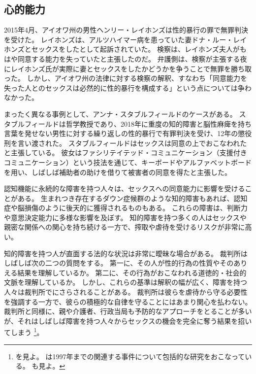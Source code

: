 \documentclass[paper=a4,book,openany]{jlreq}
\begin{document}
\subsection{心的能力}

2015年4月、アイオワ州の男性ヘンリー・レイホンズは性的暴行の罪で無罪判決を受けた。
レイホンズは、アルツハイマー病を患っていた妻ドナ・ルー・レイホンズとセックスをしたとして起訴されていた。
検察は、レイホンズ夫人がもはや同意する能力を失っていたと主張したのだ。
弁護側は、検察が主張する夜にレイホンズ氏が実際に妻とセックスをしたかどうかを争うことで無罪を勝ち取った。
しかし、アイオワ州の法律に対する検察の解釈、すなわち「同意能力を失った人とのセックスは必然的に性的暴行を構成する」という点については争わなかった\citep{belluck15:_sex_demen_husban_trial_age}。

まったく異なる事例として、アンナ・スタブルフィールドのケースがある。
スタブルフィールドは哲学教授であり、2018年に重度の知的障害と脳性麻痺を持ち言葉を発せない男性に対する繰り返しの性的暴行で有罪判決を受け、12年の懲役刑を言い渡された。
スタブルフィールドはセックスは同意の上でおこなわれたと主張している。
彼女はファシリテイテッド・コミュニケーション（支援付きコミュニケーション）という技法を通じて、キーボードやアルファベットボードを用い、しばしば補助者の助けを借りて被害者の同意を得たと主張した\citep{engber15:_stran_case_anna_stubb}。

認知機能に永続的な障害を持つ人々は、セックスへの同意能力に影響を受けることがある。
生まれつき存在するダウン症候群のような知的障害もあれば、認知症や脳損傷のように後天的に獲得されるものもある。
これらの障害は、判断力や意思決定能力に多様な影響を及ぼす。
知的障害を持つ多くの人はセックスや親密な関係への関心を持ち続ける一方で、搾取や虐待を受けるリスクが非常に高い\citep{justice16:_crime_person_disab}。

知的障害を持つ人が直面する法的な状況は非常に曖昧な場合がある。
裁判所はしばしば次の二つの質問をする。
第一に、その人が性的行為の性質やそのありえる結果を理解しているか。
第二に、その行為がおこなわれる道徳的・社会的文脈を理解しているか。
しかし、これらの基準は解釈の幅が広く、障害を持つ人々は裁判所でにさらされることがある。
裁判所は彼らを虐待から守る必要性を強調する一方で、彼らの積極的な自律を守ることにはあまり関心を払わない。
裁判所と同様に、親や介護者、行政当局も予防的なアプローチをとることが多いが、それはしばしば障害を持つ人々からセックスの機会を完全に奪う結果を招いてしまう\nocite{appel10:_sex_right_disab} \footnote{\citet{appel10:_sex_right_disab}を見よ。
\citet{denno97:_sexual_rape_mental_retar}は1997年までの関連する事件について包括的な研究をおこなっている。
\citet[p.86]{kulick15:_lonel_its_oppos}も見よ。
}。
\end{document}
